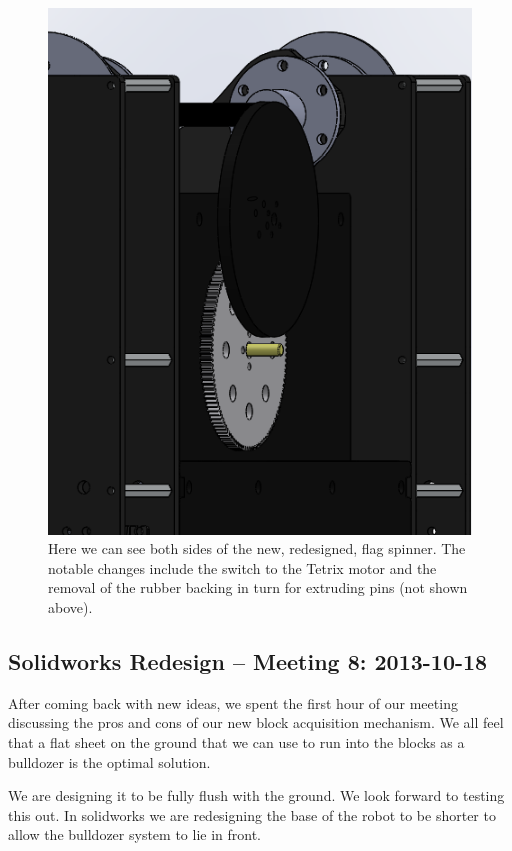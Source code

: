 \begin{figure}[H]
\begin{center}
\includegraphics[scale=0.5]{images/FlagSpinnerV2Front.png}
\end{center}
\caption{Here we can see both sides of the new, redesigned, flag spinner. The notable changes include the switch to the Tetrix motor and the removal of the rubber backing in turn for extruding pins (not shown above).}
\end{figure}

\newpage \subsection{Solidworks Redesign -- Meeting 8: 2013-10-18}

After coming back with new ideas, we spent the first hour of our meeting discussing the pros and cons of our new block acquisition mechanism. We all feel that a flat sheet on the ground that we can use to run into the blocks as a bulldozer is the optimal solution. 

We are designing it to be fully flush with the ground. We look forward to testing this out. In solidworks we are redesigning the base of the robot to be shorter to allow the bulldozer system to lie in front. 

